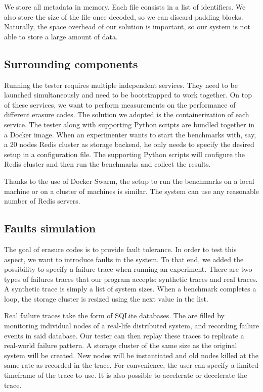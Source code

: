We store all metadata in memory.
Each file consists in a list of identifiers.
We also store the size of the file once decoded, so we can discard padding blocks.
Naturally, the space overhead of our solution is important, so our system is not able to store a large amount of data.

\subsection{Surrounding components}

Running the tester requires multiple independent services.
They need to be launched simultaneously and need to be bootstrapped to work together.
On top of these services, we want to perform measurements on the performance of different erasure codes.
The solution we adopted is the containerization of each service.
The tester along with supporting Python scripts are bundled together in a Docker image.
When an experimenter wants to start the benchmarks with, say, a 20 nodes Redis cluster as storage backend, he only needs to specify the desired setup in a configuration file.
The supporting Python scripts will configure the Redis cluster and then run the benchmarks and collect the results.

Thanks to the use of Docker Swarm, the setup to run the benchmarks on a local machine or on a cluster of machines is similar.
The system can use any reasonable number of Redis servers.

\subsection{Faults simulation}

The goal of erasure codes is to provide fault tolerance.
In order to test this aspect, we want to introduce faults in the system.
To that end, we added the possibility to specify a failure trace when running an experiment.
There are two types of failures traces that our program accepts: synthetic traces and real traces.
A synthetic trace is simply a list of system sizes.
When a benchmark completes a loop, the storage cluster is resized using the next value in the list.

Real failure traces take the form of SQLite databases.
The are filled by monitoring individual nodes of a real-life distributed system, and recording failure events in said database.
Our tester can then replay these traces to replicate a real-world failure pattern.
A storage cluster of the same size as the original system will be created.
New nodes will be instantiated and old nodes killed at the same rate as recorded in the trace.
For convenience, the user can specify a limited timeframe of the trace to use.
It is also possible to accelerate or decelerate the trace.
